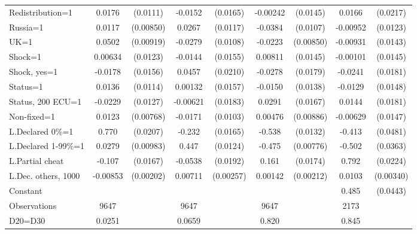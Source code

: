\begin{tabular}{l|cccccc|cc}
Redistribution=1&   0.0176         & (0.0111)&  -0.0152         & (0.0165)& -0.00242         & (0.0145)&   0.0166         & (0.0217)\\
Russia=1        &   0.0117         &(0.00850)&   0.0267\sym{**} & (0.0117)&  -0.0384\sym{***}& (0.0107)& -0.00952         & (0.0123)\\
UK=1            &   0.0502\sym{***}&(0.00919)&  -0.0279\sym{**} & (0.0108)&  -0.0223\sym{***}&(0.00850)& -0.00931         & (0.0143)\\
Shock=1         &  0.00634         & (0.0123)&  -0.0144         & (0.0155)&  0.00811         & (0.0145)& -0.00101         & (0.0145)\\
Shock, yes=1    &  -0.0178         & (0.0156)&   0.0457\sym{**} & (0.0210)&  -0.0278         & (0.0179)&  -0.0241         & (0.0181)\\
Status=1        &   0.0136         & (0.0114)&  0.00132         & (0.0157)&  -0.0150         & (0.0138)&  -0.0129         & (0.0148)\\
Status, 200 ECU=1&  -0.0229\sym{*}  & (0.0127)& -0.00621         & (0.0183)&   0.0291\sym{*}  & (0.0167)&   0.0144         & (0.0181)\\
Non-fixed=1     &   0.0123         &(0.00768)&  -0.0171\sym{*}  & (0.0103)&  0.00476         &(0.00886)& -0.00629         & (0.0147)\\
L.Declared 0\%=1&    0.770\sym{***}& (0.0207)&   -0.232\sym{***}& (0.0165)&   -0.538\sym{***}& (0.0132)&   -0.413\sym{***}& (0.0481)\\
L.Declared 1-99\%=1&   0.0279\sym{***}&(0.00983)&    0.447\sym{***}& (0.0124)&   -0.475\sym{***}&(0.00776)&   -0.502\sym{***}& (0.0363)\\
L.Partial cheat &   -0.107\sym{***}& (0.0167)&  -0.0538\sym{***}& (0.0192)&    0.161\sym{***}& (0.0174)&    0.792\sym{***}& (0.0224)\\
L.Dec. others, 1000& -0.00853\sym{***}&(0.00202)&  0.00711\sym{***}&(0.00257)&  0.00142         &(0.00212)&   0.0103\sym{***}&(0.00340)\\
Constant        &                  &         &                  &         &                  &         &    0.485\sym{***}& (0.0443)\\
\hline
Observations    &     9647         &         &     9647         &         &     9647         &         &     2173         &         \\
D20=D30         &   0.0251         &         &   0.0659         &         &    0.820         &         &    0.845         &         \\

\end{tabular}
